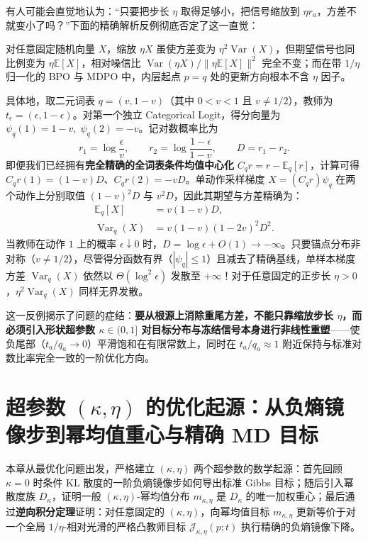 \documentclass[lang=cn,scheme=chinese,openany]{../book/elegantbook}
\newcommand{\E}{\mathbb E}
\newcommand{\Var}{\operatorname{Var}}
\begin{document}
有人可能会直觉地认为：“只要把步长 $\eta$ 取得足够小，把信号缩放到 $\eta r_a$，方差不就变小了吗？”下面的精确解析反例彻底否定了这一直觉：

\begin{example}[非对称二元词表下标准对数比率信号的方差发散反例]
\label{ex:binary-variance-divergence}
对任意固定随机向量 $X$，缩放 $\eta X$ 虽使方差变为 $\eta^2\Var(X)$，但期望信号也同比例变为 $\eta\E[X]$，相对噪信比 $\Var(\eta X)/\|\eta\E[X]\|^2$ 完全不变；而在带 $1/\eta$ 归一化的 BPO 与 MDPO 中，内层起点 $p=q$ 处的更新方向根本不含 $\eta$ 因子。

具体地，取二元词表 $q=(v,1-v)$（其中 $0<v<1$ 且 $v\ne 1/2$），教师为 $t_\epsilon=(\epsilon,1-\epsilon)$。对第一个独立 Categorical Logit，得分向量为 $\psi_q(1)=1-v,\;\psi_q(2)=-v$。记对数概率比为
\begin{equation}
 r_1=\log\frac{\epsilon}{v},\qquad r_2=\log\frac{1-\epsilon}{1-v},\qquad D=r_1-r_2.
\end{equation}
即便我们已经拥有\textbf{完全精确的全词表条件均值中心化} $C_q r=r-\E_q[r]$，计算可得 $C_q r(1)=(1-v)D$、$C_q r(2)=-vD$。单动作采样梯度 $X=(C_q r)\psi_q$ 在两个动作上分别取值 $(1-v)^2 D$ 与 $v^2 D$，因此其期望与方差精确为：
\begin{align}
 \E_q[X]&=v(1-v)D,\\
 \Var_q(X)&=v(1-v)(1-2v)^2 D^2.
 \label{eq:proximal-binary-variance}
\end{align}
当教师在动作 $1$ 上的概率 $\epsilon\downarrow 0$ 时，$D=\log\epsilon+O(1)\to-\infty$。只要锚点分布非对称（$v\ne 1/2$），尽管得分函数有界（$|\psi_q|\le 1$）且减去了精确基线，单样本梯度方差 $\Var_q(X)$ 依然以 $\Theta(\log^2\epsilon)$ 发散至 $+\infty$！对于任意固定的正步长 $\eta>0$，$\eta^2\Var_q(X)$ 同样无界发散。
\end{example}

这一反例揭示了问题的症结：\textbf{要从根源上消除重尾方差，不能只靠缩放步长 $\eta$，而必须引入形状超参数 $\kappa\in(0,1]$ 对目标分布与冻结信号本身进行非线性重塑}——使负尾部（$t_a/q_a\to 0$）平滑饱和在有限常数上，同时在 $t_a/q_a\approx 1$ 附近保持与标准对数比率完全一致的一阶优化方向。


\chapter{超参数 \texorpdfstring{$(\kappa,\eta)$}{(kappa, eta)} 的优化起源：从负熵镜像步到幂均值重心与精确 MD 目标}
\label{ch:kappa-eta-origin}

本章从最优化问题出发，严格建立 $(\kappa,\eta)$ 两个超参数的数学起源：首先回顾 $\kappa=0$ 时条件 KL 散度的一阶负熵镜像步如何导出标准 Gibbs 目标；随后引入幂散度族 $D_\kappa$，证明一般 $(\kappa,\eta)$-幂均值分布 $m_{\kappa,\eta}$ 是 $D_\kappa$ 的唯一加权重心；最后通过\textbf{逆向积分定理}证明：对任意固定的 $(\kappa,\eta)$，向幂均值目标 $m_{\kappa,\eta}$ 更新等价于对一个全局 $1/\eta$-相对光滑的严格凸教师目标 $\mathcal J_{\kappa,\eta}(p;t)$ 执行精确的负熵镜像下降。
\end{document}
